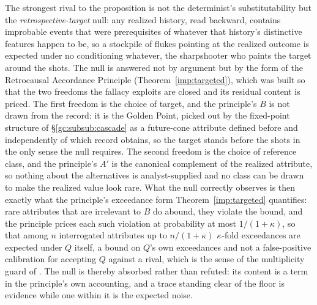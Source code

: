 \begin{remark}
\label{gc:rem:sharpshooter}
The strongest rival to the proposition is not the determinist's
substitutability but the \emph{retrospective-target} null: any
realized history, read backward, contains improbable events that were
prerequisites of whatever that history's distinctive features happen
to be, so a stockpile of flukes pointing at the realized outcome is
expected under no conditioning whatever, the sharpshooter who paints
the target around the shots. The null is answered not by argument but
by the form of the Retrocausal Accordance Principle
(Theorem~\ref{imp:targeted}), which was built so that the
two freedoms the fallacy exploits are closed and its residual content
is priced. The first freedom is the choice of target, and the
principle's $B$ is not drawn from the record: it is the Golden Point,
picked out by the fixed-point structure of \S\ref{gc:subsub:cascade}
as a future-cone attribute defined before and independently of which
record obtains, so the target stands before the shots in the only
sense the null requires. The second freedom is the choice of
reference class, and the principle's $A'$ is the canonical complement
of the realized attribute, so nothing about the alternatives is
analyst-supplied and no class can be drawn to make the realized value
look rare. What the null correctly observes is then exactly what the
principle's exceedance form Theorem~\ref{imp:targeted} quantifies:
rare attributes that are irrelevant to $B$ do abound, they violate the
bound, and the principle prices each such violation at probability at
most $1/(1+\kappa)$, so that among $n$ interrogated attributes up to $n/(1+\kappa)$ $\kappa$-fold exceedances are expected under $Q$ itself, a bound on $Q$'s own exceedances and not a false-positive calibration for accepting $Q$ against a rival, which is the sense of the multiplicity guard of \cite{GoldenTargeted}. The null is thereby
absorbed rather than refuted: its content is a term in the
principle's own accounting, and a trace standing clear of the floor
is evidence while one within it is the expected noise.


\end{remark}

